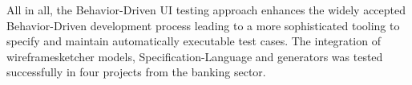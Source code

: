 \documentclass{sig-alternate-05-2015}
\begin{document}
All in all, the Behavior-Driven UI testing approach enhances the widely accepted Behavior-Driven development process leading to a more sophisticated tooling to specify and maintain automatically executable test cases.
The integration of wireframesketcher models, Specification-Language and generators was tested successfully in four projects from the banking sector. 







%



%
%

\end{document}
